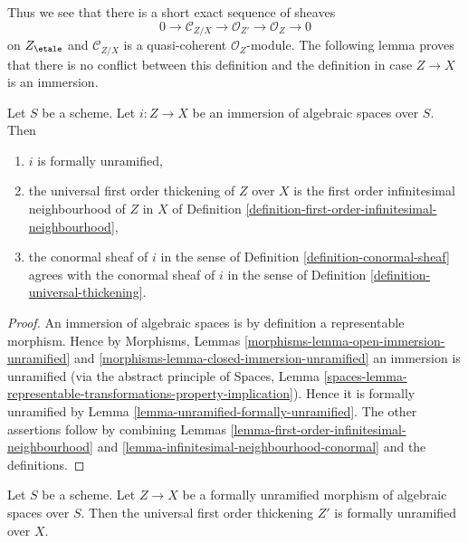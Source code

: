 \noindent
Thus we see that there is a short exact sequence of sheaves
$$
0 \to \mathcal{C}_{Z/X} \to \mathcal{O}_{Z'} \to \mathcal{O}_Z \to 0
$$
on $Z_\etale$ and $\mathcal{C}_{Z/X}$ is a quasi-coherent
$\mathcal{O}_Z$-module. The following lemma proves that there is no
conflict between this definition and the definition in case $Z \to X$
is an immersion.

\begin{lemma}
\label{lemma-immersion-universal-thickening}
Let $S$ be a scheme.
Let $i : Z \to X$ be an immersion of algebraic spaces over $S$. Then
\begin{enumerate}
\item $i$ is formally unramified,
\item the universal first order thickening of $Z$ over $X$ is the first order
infinitesimal neighbourhood of $Z$ in $X$ of
Definition \ref{definition-first-order-infinitesimal-neighbourhood},
\item the conormal sheaf of $i$ in the sense of
Definition \ref{definition-conormal-sheaf}
agrees with the conormal sheaf of $i$ in the sense of
Definition \ref{definition-universal-thickening}.
\end{enumerate}
\end{lemma}

\begin{proof}
An immersion of algebraic spaces is by definition a representable morphism.
Hence by
Morphisms, Lemmas \ref{morphisms-lemma-open-immersion-unramified} and
\ref{morphisms-lemma-closed-immersion-unramified}
an immersion is unramified (via the abstract principle of
Spaces, Lemma
\ref{spaces-lemma-representable-transformations-property-implication}).
Hence it is formally unramified by
Lemma \ref{lemma-unramified-formally-unramified}.
The other assertions follow by combining
Lemmas \ref{lemma-first-order-infinitesimal-neighbourhood} and
\ref{lemma-infinitesimal-neighbourhood-conormal}
and the definitions.
\end{proof}

\begin{lemma}
\label{lemma-universal-thickening-unramified}
Let $S$ be a scheme.
Let $Z \to X$ be a formally unramified morphism of algebraic spaces over $S$.
Then the universal first order thickening $Z'$ is formally
unramified over $X$.
\end{lemma}

